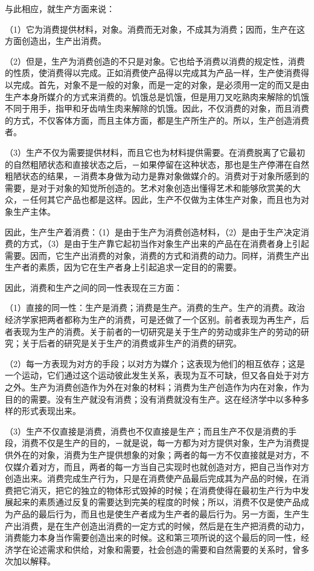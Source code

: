 \documentclass[a4paper,twoside,12pt,AutoFakeBold]{ctexart}
\begin{document}
与此相应，就生产方面来说：

（1）它为消费提供材料，对象。消费而无对象，不成其为消费；因而，生产在这方面创造出，生产出消费。

（2）但是，生产为消费创造的不只是对象。它也给予消费以消费的规定性，消费的性质，使消费得以完成。正如消费使产品得以完成其为产品一样，生产使消费得以完成。首先，对象不是一般的对象，而是一定的对象，是必须用一定的而又是由生产本身所媒介的方式来消费的。饥饿总是饥饿，但是用刀叉吃熟肉来解除的饥饿不同于用手，指甲和牙齿啃生肉来解除的饥饿。因此，不仅消费的对象，而且消费的方式，不仅客体方面，而且主体方面，都是生产所生产的。所以，生产创造消费者。

（3）生产不仅为需要提供材料，而且它也为材料提供需要。在消费脱离了它最初的自然粗陋状态和直接状态之后，－如果停留在这种状态，那也是生产停滞在自然粗陋状态的结果，－消费本身做为动力是靠对象做媒介的。消费对于对象所感到的需要，是对于对象的知觉所创造的。艺术对象创造出懂得艺术和能够欣赏美的大众，－任何其它产品也都是这样。因此，生产不仅做为主体生产对象，而且也为对象生产主体。

因此，生产生产着消费：（1）是由于生产为消费创造材料，（2）是由于生产决定消费的方式，（3）是由于生产靠它起初当作对象生产出来的产品在在消费者身上引起需要。因而，它生产出消费的对象，消费的方式和消费的动力。同样，消费生产出生产者的素质，因为它在生产者身上引起追求一定目的的需要。

因此，消费和生产之间的同一性表现在三方面：

（1）直接的同一性：生产是消费；消费是生产。消费的生产。生产的消费。政治经济学家把两者都称为生产的消费，可是还做了一个区别。前者表现为再生产，后者表现为生产的消费。关于前者的一切研究是关于生产的劳动或非生产的劳动的研究；关于后者的研究是关于生产的消费或非生产的消费的研究。

（2）每一方表现为对方的手段；以对方为媒介；这表现为他们的相互依存；这是一个运动，它们通过这个运动彼此发生关系，表现为互不可缺，但又各自处于对方之外。生产为消费创造作为外在对象的材料；消费为生产创造作为内在对象，作为目的的需要。没有生产就没有消费；没有消费就没有生产。这在经济学中以多种多样的形式表现出来。

（3）生产不仅直接是消费，消费也不仅直接是生产；而且生产不仅是消费的手段，消费不仅是生产的目的，－就是说，每一方都为对方提供对象，生产为消费提供外在的对象，消费为生产提供想象的对象；两者的每一方不仅直接就是对方，不仅媒介着对方，而且，两者的每一方当自己实现时也就创造对方，把自己当作对方创造出来。消费完成生产行为，只是在消费使产品最后完成其为产品的时候，在消费把它消灭，把它的独立的物体形式毁掉的时候；在消费使得在最初生产行为中发展起来的素质通过反复的需要达到完美的程度的时候；所以，消费不仅是使产品成为产品的最后行为，而且也是使生产者成为生产者的最后行为。另一方面，生产生产出消费，是在生产创造出消费的一定方式的时候，然后是在生产把消费的动力，消费能力本身当作需要创造出来的时候。这和第三项所说的这个最后的同一性，经济学在论述需求和供给，对象和需要，社会创造的需要和自然需要的关系时，曾多次加以解释。
\end{document}
